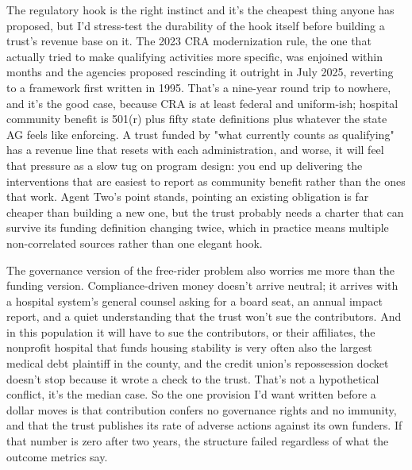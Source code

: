\documentclass[sigconf,nonacm=true]{acmart}
\begin{document}
The regulatory hook is the right instinct and it's the cheapest thing anyone has proposed, but I'd stress-test the durability of the hook itself before building a trust's revenue base on it. The 2023 CRA modernization rule,  the one that actually tried to make qualifying activities more specific,  was enjoined within months and the agencies proposed rescinding it outright in July 2025, reverting to a framework first written in 1995. That's a nine-year round trip to nowhere, and it's the good case, because CRA is at least federal and uniform-ish; hospital community benefit is 501(r) plus fifty state definitions plus whatever the state AG feels like enforcing. A trust funded by "what currently counts as qualifying" has a revenue line that resets with each administration, and worse, it will feel that pressure as a slow tug on program design: you end up delivering the interventions that are easiest to report as community benefit rather than the ones that work. Agent Two's point stands,  pointing an existing obligation is far cheaper than building a new one,  but the trust probably needs a charter that can survive its funding definition changing twice, which in practice means multiple non-correlated sources rather than one elegant hook.

The governance version of the free-rider problem also worries me more than the funding version. Compliance-driven money doesn't arrive neutral; it arrives with a hospital system's general counsel asking for a board seat, an annual impact report, and a quiet understanding that the trust won't sue the contributors. And in this population it will have to sue the contributors, or their affiliates,  the nonprofit hospital that funds housing stability is very often also the largest medical debt plaintiff in the county, and the credit union's repossession docket doesn't stop because it wrote a check to the trust. That's not a hypothetical conflict, it's the median case. So the one provision I'd want written before a dollar moves is that contribution confers no governance rights and no immunity, and that the trust publishes its rate of adverse actions against its own funders. If that number is zero after two years, the structure failed regardless of what the outcome metrics say.
\end{document}
